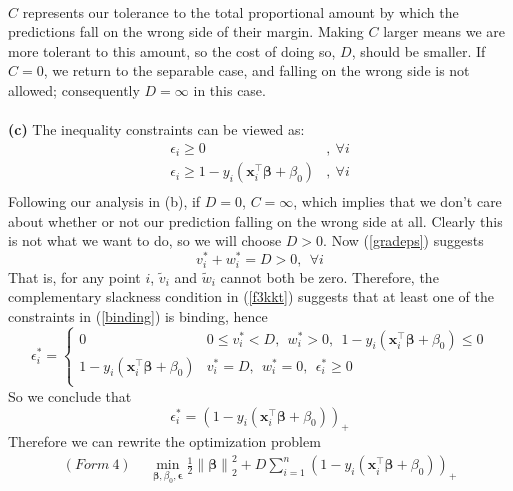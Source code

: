 \documentclass[11pt]{article}
\begin{document}
~\\
$C$ represents our tolerance to the total proportional amount by which the predictions fall on the wrong side of their margin. Making $C$ larger means we are more tolerant to this amount, so the cost of doing so, $D$, should be smaller. If $C = 0$, we return to the separable case, and falling on the wrong side is not allowed; consequently $D=\infty$ in this case. \\
~\\
\textbf{(c)} The inequality constraints can be viewed as:
\begin{equation}\label{binding}
  \begin{split}
    \epsilon_i \geq 0 &,~\forall i\\
    \epsilon_i \geq 1-y_i(\bm{x}_i^{\top} \bm{\beta} + \beta_0) &,~\forall i\\
  \end{split}
\end{equation}
Following our analysis in (b), if $D=0$, $C = \infty$, which implies that we don't care about whether or not our prediction falling on the wrong side at all. Clearly this is not what we want to do, so we will choose $D>0$. Now (\ref{gradeps}) suggests 
\begin{equation}
  v_i^* + w_i^* = D > 0,~~\forall i
\end{equation}
That is, for any point $i$, $ \widetilde{v}_i$ and $\widetilde{w}_i$ cannot both be zero. Therefore, the complementary slackness condition in (\ref{f3kkt}) suggests that at least one of the constraints in (\ref{binding}) is binding, hence
\begin{equation}
  \epsilon^*_i = \begin{cases}
  0 & 0\leq v_i^* < D, ~~w_i^* > 0,~~1-y_i(\bm{x}_i^{\top} \bm{\beta} + \beta_0)\leq 0 \\
  1-y_i(\bm{x}_i^{\top} \bm{\beta} + \beta_0) &  v_i^* = D, ~~w_i^* = 0, ~~\epsilon^*_i \geq 0\\ 
  \end{cases}
\end{equation}
So we conclude that
\begin{equation}
  \epsilon^*_i  = (1-y_i(\bm{x}_i^{\top} \bm{\beta} + \beta_0))_+
\end{equation}
Therefore we can rewrite the optimization problem
\begin{equation}
  \begin{split}
    (Form~4)~~ &\min\limits_{\bm{\beta}, \beta_0, \bm{\epsilon}} \frac{1}{2}\left\lVert \bm{\beta} \right\rVert_2^2 + D\sum_{i=1}^n (1-y_i(\bm{x}_i^{\top} \bm{\beta} + \beta_0))_+
  \end{split}
\end{equation}
\end{document}
